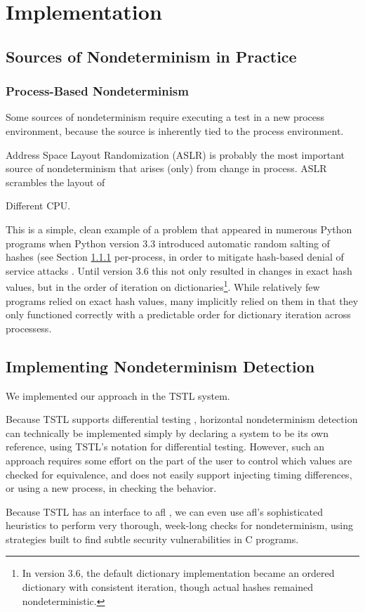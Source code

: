 \section{Implementation}

\subsection{Sources of Nondeterminism in Practice}

\subsubsection{Process-Based Nondeterminism}

\label{sec:pnondet}

Some sources of nondeterminism require executing a test in a new
process environment, because the source is inherently tied to the
process environment.

Address Space Layout Randomization (ASLR) \cite{ASLR}  is probably the most
important source of nondeterminism that arises (only) from change in
process.  ASLR scrambles the layout of 

Different CPU.

This is a simple, clean example
of a problem that appeared in numerous Python programs when Python
version 3.3 introduced automatic random salting of hashes (see Section
\ref{sec:pnondet} per-process,
in order to mitigate hash-based denial of service attacks
\cite{denial}.  Until version 3.6 this not only resulted in changes in
exact hash values, but in the order of iteration on
dictionaries\footnote{In version 3.6, the default dictionary
  implementation became an ordered dictionary with consistent
  iteration, though actual hashes remained nondeterministic.}.  While
relatively few programs relied on exact hash values, many implicitly
relied on them in that they only functioned correctly with a
predictable order for dictionary iteration across processess.

\subsection{Implementing Nondeterminism Detection}

We implemented our approach in the TSTL \cite{NFM15} system.

Because TSTL supports differential testing \cite{tstlsttt}, horizontal
nondeterminism detection can technically be implemented simply by
declaring a system to be its own reference, using TSTL's notation for
differential testing.  However, such an approach requires some effort
on the part of the user to control which values are checked for
equivalence, and does not easily support injecting timing differences,
or using a new process, in checking the behavior.



Because TSTL has an interface to afl \cite{aflfuzz}, we can even use
afl's sophisticated heuristics to perform very thorough, week-long
checks for nondeterminism, using strategies built to find subtle
security vulnerabilities in C programs.